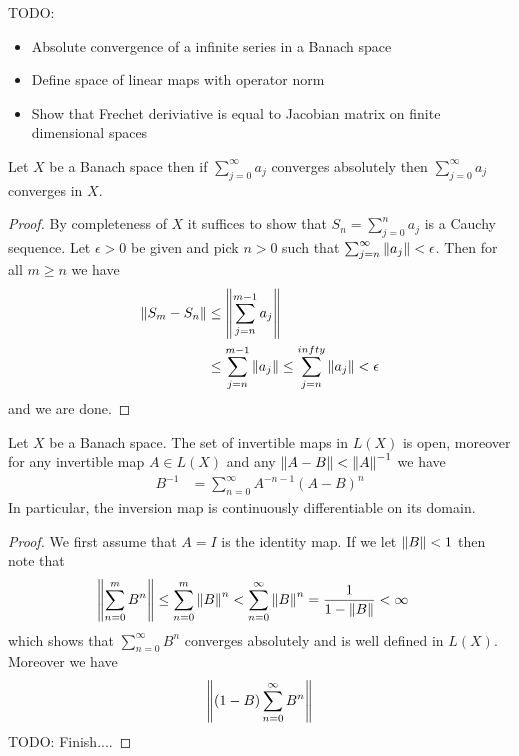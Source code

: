 TODO:
\begin{itemize}
\item Absolute convergence of a infinite series in a Banach space
\item Define space of linear maps with operator norm
\item Show that Frechet deriviative is equal to Jacobian matrix on
  finite dimensional spaces
\end{itemize}

\begin{prop}Let $X$ be a Banach space then if $\sum_{j=0}^\infty a_j$
  converges absolutely then $\sum_{j=0}^\infty a_j$ converges in $X$.
\end{prop}
\begin{proof}
By completeness of $X$ it suffices to show that $S_n = \sum_{j=0}^n
a_j$ is a Cauchy sequence.  Let $\epsilon > 0$ be given and pick $n >
0$ such that $\sum_{j=n}^\infty \left \lVert a_j \right \rVert < \epsilon$.  Then for all
$m \geq n$ we have
\begin{align*}
\left \lVert S_m - S_n \right \rVert &\leq \left \lVert \sum_{j=n}^{m-1} a_j \right \rVert \\
&\leq \sum_{j=n}^{m-1}\left \lVert  a_j \right \rVert \leq \sum_{j=n}^{infty}\left \lVert  a_j \right \rVert < \epsilon
\end{align*}
and we are done.
\end{proof}

\begin{prop}Let $X$ be a Banach space.  The set of invertible maps in $L(X)$ is open, moreover
  for any invertible map $A \in L(X)$ and any $\left \lVert A-B \right \rVert <
  \left \lVert A \right \rVert^{-1}$ we have 
\begin{align*}
B^{-1} &= \sum_{n=0}^\infty A^{-n-1} (A-B)^n 
\end{align*}
In particular, the inversion map is continuously differentiable on its domain.
\end{prop}
\begin{proof}
We first assume that $A= I$ is the identity map.  If we let $\left \lVert B \right \rVert
< 1$ then note that 
\begin{align*}
\left \lVert \sum_{n=0}^m B^n \right \rVert &\leq \sum_{n=0}^m \left \lVert  B \right \rVert^n <
                          \sum_{n=0}^\infty \left \lVert  B \right \rVert^n =
                          \frac{1}{1-\left \lVert B \right \rVert} < \infty
\end{align*}
which shows that $\sum_{n=0}^\infty B^n$ converges absolutely and
is well defined in $L(X)$.  Moreover we have
\begin{align*}
\left \lVert (1- B) \sum_{n=0}^\infty B^n  \right \rVert
\end{align*}
TODO: Finish....
\end{proof}


